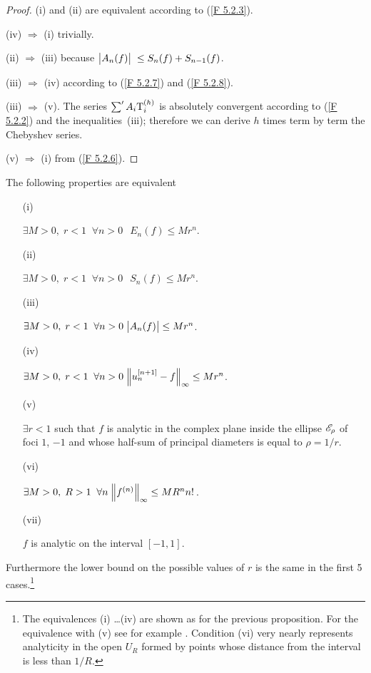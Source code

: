 %
\begin{proof}
(i) and (ii) are equivalent according to (\ref{F 5.2.3}). 

\noindent 
(iv) $\Rightarrow$ (i) trivially. 

\noindent 
(ii) $\Rightarrow$ (iii) because $\big|{A_n(f)}\big|\;  \leq S_n(f) + S_{n-
1}(f)$. 

\noindent 
(iii) $\Rightarrow$ (iv) according to (\ref{F 5.2.7}) and (\ref{F 5.2.8}). 

\noindent 
(iii) $\Rightarrow$ (v). The series $\sum'A_i{\rm T}_i^{(h)}$ is absolutely convergent according to (\ref{F 5.2.2}) and the inequalities~(iii); therefore we can derive $h$ times term by term the Chebyshev series. 

\noindent 
(v) $\Rightarrow$ (i) from (\ref{F 5.2.6}). 
\end{proof}

\smallskip{} 

\noindent 
The following properties are equivalent 
\begin{itemize}\itemsep2pt

\item [(i)] 

$ \exists M > 0, \;  r < 1 \; \; \forall n> 0  \;\;\, E_n(f) \leq Mr^n$.

\item [(ii)] 

$\exists M > 0, \;  r < 1 \; \; \forall n> 0  \;\;\, S_n(f) \leq Mr^n$. 

\item [(iii)] 

$\exists M >0, \;  r < 1 \;\; \forall n> 0 \; \big|{A_n(f)}\big| \leq Mr^n$.

\item [(iv)] 

$ \exists M > 0, \;  r < 1 \; \; \forall n> 0  \; \Big\lVert  u_n^{[n+1]} - f  \Big\rVert_{\infty}   \leq Mr^n$.

\item [(v)] 

$\exists r < 1$ such that $f$ is analytic in the complex plane inside the ellipse ${{\mathscr E}}_\rho$ of foci $1$, $-1$ and whose half-sum of principal diameters is equal to $\rho = 1/r$.

\item [(vi)] 

$ \exists M > 0, \;  R > 1 \; \; \forall n \;  \Big\lVert f^{(n)}  \Big\rVert_{\infty}  \leq MR^nn!$\,.

\item [(vii)] 

$f$ is analytic on the interval $[-1,1]$.
\end{itemize}
Furthermore the lower bound on the possible values of $r$ is the same in the first 5 cases.\footnote{The equivalences (i) \ldots (iv) are shown as for the previous proposition. For the equivalence with (v) see for example \cite{Ri}. Condition (vi) very nearly represents analyticity in the open $U_R$ formed by points whose distance from the interval is less than $1/R$.}

